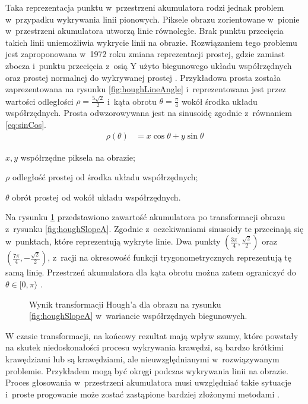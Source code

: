 Taka reprezentacja punktu w~przestrzeni akumulatora rodzi jednak problem w~przypadku wykrywania linii pionowych. Piksele obrazu zorientowane w~pionie w~przestrzeni akumulatora utworzą linie równoległe. Brak punktu przecięcia takich linii uniemożliwia wykrycie linii na obrazie. Rozwiązaniem tego problemu jest zaproponowana w~1972 roku zmiana reprezentacji prostej, gdzie zamiast zbocza i~punktu przecięcia z~osią Y użyto biegunowego układu współrzędnych oraz prostej normalnej do wykrywanej prostej \cite{duda1972use}. Przykładowa prosta została zaprezentowana na rysunku \ref{fig:houghLineAngle} i~reprezentowana jest przez wartości odległości $\rho=\frac{5\sqrt{2}}{2}$ i~kąta obrotu $\theta=\frac{\pi}{4}$ wokół środka układu współrzędnych. Prosta odwzorowywana jest na sinusoidę zgodnie z~równaniem \ref{eq:sinCos}.
\begin{align}
    \rho(\theta) &= x\cos{\theta} + y\sin{\theta} \label{eq:sinCos}
\end{align}
\begin{eqexpl}
    \item{$x, y$} współrzędne piksela na obrazie;
    \item{$\rho$} odległość prostej od środka układu współrzędnych;
    \item{$\theta$} obrót prostej od wokół układu współrzędnych.
\end{eqexpl}

Na rysunku \ref{fig:houghSinCos} przedstawiono zawartość akumulatora po transformacji obrazu z~rysunku \ref{fig:houghSlopeA}. Zgodnie z~oczekiwaniami sinusoidy te przecinają się w~punktach, które reprezentują wykryte linie. Dwa punkty $(\frac{3\pi}{4}, \frac{\sqrt{2}}{2})$ oraz $(\frac{7\pi}{4}, -\frac{\sqrt{2}}{2})$, z~racji na okresowość funkcji trygonometrycznych reprezentują tę samą linię. Przestrzeń akumulatora dla kąta obrotu można zatem ograniczyć do $\theta \in \lbrack 0, \pi\rangle$ \cite{immerkaer1998some}.

\begin{figure}[t]
    \centering
    
    \caption{Wynik transformacji Hough'a dla obrazu na rysunku \ref{fig:houghSlopeA} w~wariancie współrzędnych biegunowych.}
    \label{fig:houghSinCos}
\end{figure}


W czasie transformacji, na końcowy rezultat mają wpływ szumy, które powstały na skutek niedoskonałości procesu wykrywania krawędzi, są bardzo krótkimi krawędziami lub są krawędziami, ale nieuwzględnianymi w~rozwiązywanym problemie. Przykładem mogą być okręgi podczas wykrywania linii na obrazie. Proces głosowania w~przestrzeni akumulatora musi uwzględniać takie sytuacje i~proste progowanie może zostać zastąpione bardziej złożonymi metodami \cite{palmer1997optimizing, perantonis1998robust}.

